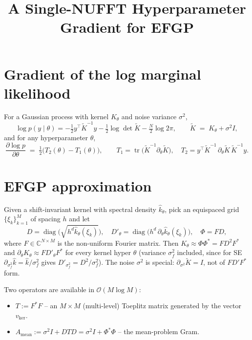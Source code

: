 \documentclass[11pt]{article}
\title{A Single-NUFFT Hyperparameter Gradient for EFGP}
\author{}
\date{}
\newcommand{\tr}{\operatorname{tr}}
\newcommand{\bigo}{\mathcal{O}}
\newcommand{\Ktil}{\widetilde K}
\begin{document}
\maketitle

\section{Gradient of the log marginal likelihood}

For a Gaussian process with kernel $K_\theta$ and noise variance $\sigma^2$,
\begin{equation}
  \log p(y \mid \theta) = -\tfrac12 y^\top \Ktil^{-1} y - \tfrac12 \log\det \Ktil - \tfrac{N}{2}\log 2\pi,
  \qquad \Ktil \;=\; K_\theta + \sigma^2 I,
\end{equation}
and for any hyperparameter $\theta$,
\begin{equation}
  \frac{\partial \log p}{\partial \theta}
  \;=\; \tfrac12\bigl( T_2(\theta) - T_1(\theta) \bigr),
  \qquad
  T_1 = \tr\!\bigl(\Ktil^{-1}\partial_\theta \Ktil\bigr),\quad
  T_2 = y^\top \Ktil^{-1}\, \partial_\theta \Ktil\, \Ktil^{-1} y.
\end{equation}

\section{EFGP approximation}

Given a shift-invariant kernel with spectral density $\hat k_\theta$, pick an equispaced
grid $\{\xi_k\}_{k=1}^M$ of spacing $h$ and let
\begin{equation}
  D = \operatorname{diag}\!\bigl(\sqrt{h^d \hat k_\theta(\xi_k)}\bigr),\quad
  D'_\theta = \operatorname{diag}\!\bigl(h^d\,\partial_\theta \hat k_\theta(\xi_k)\bigr),\quad
  \Phi = F D,
\end{equation}
where $F\in\mathbb{C}^{N\times M}$ is the non-uniform Fourier matrix. Then
$K_\theta \approx \Phi\Phi^* = F D^2 F^*$ and $\partial_\theta K_\theta \approx F D'_\theta F^*$ for every kernel hyper $\theta$ (variance $\sigma_f^2$ included, since for SE $\partial_{\sigma_f^2}\hat k = \hat k/\sigma_f^2$ gives $D'_{\sigma_f^2} = D^2/\sigma_f^2$). The noise $\sigma^2$ is special: $\partial_{\sigma^2}\Ktil = I$, not of $FD'F^*$ form.

Two operators are available in $\bigo(M\log M)$:
\begin{itemize}
\item $T := F^*F$ -- an $M\times M$ (multi-level) Toeplitz matrix generated by the vector $v_{\text{ker}}$.
\item $A_{\text{mean}} := \sigma^2 I + DTD = \sigma^2 I + \Phi^*\Phi$ -- the mean-problem Gram.
\end{itemize}
\end{document}
